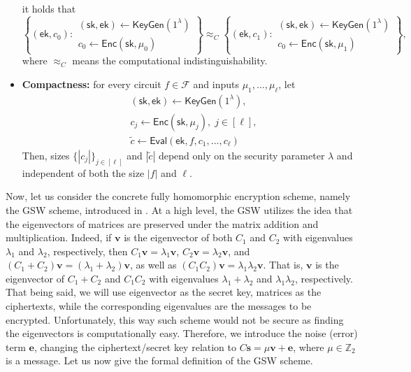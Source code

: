 \documentclass{iacrtrans}
\begin{document}
\begin{definition}
\begin{itemize}
        it holds that
        \begin{equation*}
            \left\{ (\mathsf{ek},c_0): \begin{matrix}
                (\mathsf{sk},\mathsf{ek}) \gets \mathsf{KeyGen}(1^{\lambda}) \\
                c_0 \gets \mathsf{Enc}(\mathsf{sk},\mu_0)
            \end{matrix} \right\} \approx_C \left\{ (\mathsf{ek},c_1): \begin{matrix}
                (\mathsf{sk},\mathsf{ek}) \gets \mathsf{KeyGen}(1^{\lambda}) \\
                c_0 \gets \mathsf{Enc}(\mathsf{sk},\mu_1)
            \end{matrix} \right\},
        \end{equation*}
        where $\approx_C$ means the computational indistinguishability.
        \item \textbf{Compactness:} for every circuit $f \in \mathcal{F}$ and
        inputs $\mu_1,\dots,\mu_{\ell}$, let 
        \begin{align*}
        &(\mathsf{sk},\mathsf{ek}) \gets
        \mathsf{KeyGen}(1^{\lambda}), \\
        &c_j \gets \mathsf{Enc}(\mathsf{sk},\mu_j), \; j \in [\ell], \\
        &\widetilde{c} \gets \mathsf{Eval}(\mathsf{ek},f,c_1,\dots,c_{\ell})
        \end{align*}
        Then, sizes $\{|c_j|\}_{j \in [\ell]}$ and $|\widetilde{c}|$ depend only
        on the security parameter $\lambda$ and independent of both the size
        $|f|$ and $\ell$.
    \end{itemize}
\end{definition}

Now, let us consider the concrete fully homomorphic encryption scheme, namely
the GSW scheme, introduced in \cite{gsw}. At a high level, the GSW utilizes the
idea that the eigenvectors of matrices are preserved under the matrix addition
and multiplication. Indeed, if $\mathbf{v}$ is the eigenvector of both $C_1$ and
$C_2$ with eigenvalues $\lambda_1$ and $\lambda_2$, respectively, then
$C_1\mathbf{v}=\lambda_1\mathbf{v}$, $C_2\mathbf{v}=\lambda_2\mathbf{v}$, and
$(C_1+C_2)\mathbf{v}=(\lambda_1+\lambda_2)\mathbf{v}$, as well as
$(C_1C_2)\mathbf{v}=\lambda_1\lambda_2\mathbf{v}$. That is, $\mathbf{v}$ is the
eigenvector of $C_1+C_2$ and $C_1C_2$ with eigenvalues $\lambda_1+\lambda_2$ and
$\lambda_1\lambda_2$, respectively. That being said, we will use eigenvector as
the secret key, matrices as the ciphertexts, while the corresponding eigenvalues
are the messages to be encrypted. Unfortunately, this way such scheme would not
be secure as finding the eigenvectors is computationally easy. Therefore, we
introduce the noise (error) term $\mathbf{e}$, changing the ciphertext/secret
key relation to $C\mathbf{s}=\mu\mathbf{v}+\mathbf{e}$, where $\mu \in
\mathbb{Z}_2$ is a message. Let us now give the formal definition of the GSW
scheme.
\end{document}
